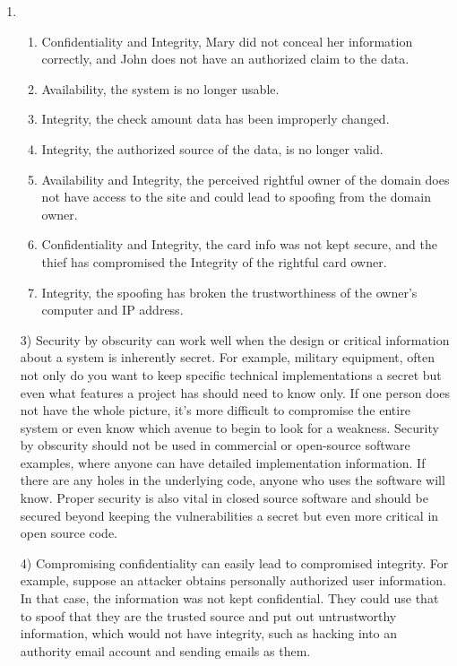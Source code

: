 \documentclass[journal,onecolumn]{IEEEtran}
\begin{document}
\begin{enumerate}
  \item 
    \begin{enumerate} 
      \item Confidentiality and Integrity, Mary did not conceal her information correctly, and John does not have an authorized claim to the data.
      \item Availability, the system is no longer usable.
      \item Integrity, the check amount data has been improperly changed.
      \item Integrity, the authorized source of the data, is no longer valid.
      \item Availability and Integrity, the perceived rightful owner of the domain does not have access to the site and could lead to spoofing from the domain owner.
      \item Confidentiality and Integrity, the card info was not kept secure, and the thief has compromised the Integrity of the rightful card owner.
      \item Integrity, the spoofing has broken the trustworthiness of the owner's computer and IP address.
    \end{enumerate}
  \item [3)] Security by obscurity can work well when the design or critical information about a system is inherently secret. For example, military equipment, often not only do you want to keep specific technical implementations a secret but even what features a project has should need to know only. If one person does not have the whole picture, it's more difficult to compromise the entire system or even know which avenue to begin to look for a weakness.
        Security by obscurity should not be used in commercial or open-source software examples, where anyone can have detailed implementation information. If there are any holes in the underlying code, anyone who uses the software will know. Proper security is also vital in closed source software and should be secured beyond keeping the vulnerabilities a secret but even more critical in open source code.
  \item [4)] Compromising confidentiality can easily lead to compromised integrity. For example, suppose an attacker obtains personally authorized user information. In that case, the information was not kept confidential. They could use that to spoof that they are the trusted source and put out untrustworthy information, which would not have integrity, such as hacking into an authority email account and sending emails as them.

\end{enumerate}
\end{document}
